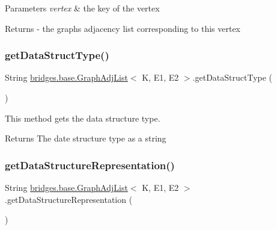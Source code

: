 \begin{DoxyParams}{Parameters}
{\em vertex} & the key of the vertex\\
\hline
\end{DoxyParams}
\begin{DoxyReturn}{Returns}
-\/ the graph\textquotesingle{}s adjacency list corresponding to this vertex 
\end{DoxyReturn}
\mbox{\label{classbridges_1_1base_1_1_graph_adj_list_a40c4a2faf20c9847e8ba0d8024236a4b}} 
\subsubsection{\texorpdfstring{get\+Data\+Struct\+Type()}{getDataStructType()}}
{\footnotesize\ttfamily String \hyperlink{classbridges_1_1base_1_1_graph_adj_list}{bridges.\+base.\+Graph\+Adj\+List}$<$ K, E1, E2 $>$.get\+Data\+Struct\+Type (\begin{DoxyParamCaption}{ }\end{DoxyParamCaption})}



This method gets the data structure type. 

\begin{DoxyReturn}{Returns}
The date structure type as a string 
\end{DoxyReturn}
\mbox{\label{classbridges_1_1base_1_1_graph_adj_list_a9bba66056cdf24197c41fff455e19a6c}} 
\subsubsection{\texorpdfstring{get\+Data\+Structure\+Representation()}{getDataStructureRepresentation()}}
{\footnotesize\ttfamily String \hyperlink{classbridges_1_1base_1_1_graph_adj_list}{bridges.\+base.\+Graph\+Adj\+List}$<$ K, E1, E2 $>$.get\+Data\+Structure\+Representation (\begin{DoxyParamCaption}{ }\end{DoxyParamCaption})}

